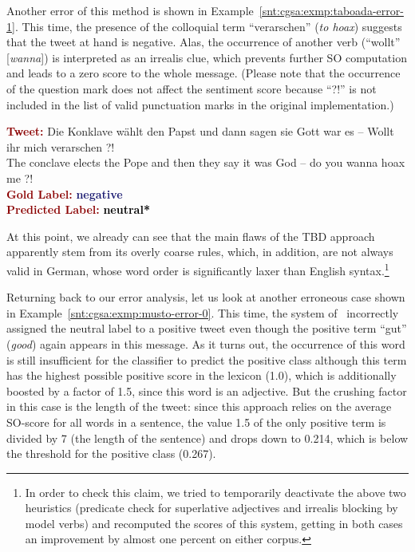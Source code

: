 \noindent Another error of this method is shown in
Example~\ref{snt:cgsa:exmp:taboada-error-1}.  This time, the presence
of the colloquial term ``verarschen'' (\emph{to hoax}) suggests that
the tweet at hand is negative.  Alas, the occurrence of another verb
(``wollt'' [\emph{wanna}]) is interpreted as an irrealis clue, which
prevents further SO computation and leads to a zero score to the whole
message.  (Please note that the occurrence of the question mark does
not affect the sentiment score because ``?!'' is not included in the
list of valid punctuation marks in the original implementation.)

\begin{example}\label{snt:cgsa:exmp:taboada-error-1}
  \noindent\textup{\bfseries\textcolor{darkred}{Tweet:}} {\upshape Die Konklave w\"ahlt den Papst und dann sagen sie Gott war es -- Wollt ihr mich verarschen ?!}\\
  \noindent The conclave elects the Pope and then they say it was God -- do you wanna hoax me ?!\\[\exampleSep]
  \noindent\textup{\bfseries\textcolor{darkred}{Gold Label:}}\hspace*{4.3em}\textbf{%
    \upshape\textcolor{midnightblue}{negative}}\\
 \noindent\textup{\bfseries\textcolor{darkred}{Predicted Label:}}\hspace*{2em}\textbf{%
    \upshape\textcolor{black}{neutral*}}
\end{example}

At this point, we already can see that the main flaws of the TBD
approach apparently stem from its overly coarse rules, which, in
addition, are not always valid in German, whose word order is
significantly laxer than English syntax.\footnote{In order to check
  this claim, we tried to temporarily deactivate the above two
  heuristics (predicate check for superlative adjectives and irrealis
  blocking by model verbs) and recomputed the scores of this system,
  getting in both cases an improvement by almost one percent on either
  corpus.}

Returning back to our error analysis, let us look at another erroneous
case shown in Example~\ref{snt:cgsa:exmp:musto-error-0}. This time,
the system of~\citet{Musto:14} incorrectly assigned the neutral label
to a positive tweet even though the positive term ``gut''
(\emph{good}) again appears in this message.  As it turns out, the
occurrence of this word is still insufficient for the classifier to
predict the positive class although this term has the highest possible
positive score in the lexicon (1.0), which is additionally boosted by
a factor of 1.5, since this word is an adjective.  But the crushing
factor in this case is the length of the tweet: since this approach
relies on the average SO-score for all words in a sentence, the value
1.5 of the only positive term is divided by 7 (the length of the
sentence) and drops down to 0.214, which is below the threshold for
the positive class (0.267).

